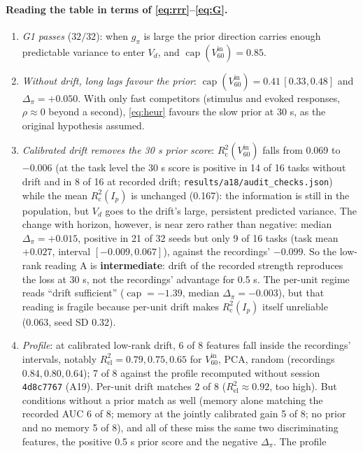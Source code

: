 \documentclass[11pt]{article}
\newcommand{\Rc}{R^2_{\mathrm{c}}}
\begin{document}
\paragraph{Reading the table in terms of \eqref{eq:rrr}--\eqref{eq:G}.}
\begin{enumerate}
\item \emph{G1 passes} ($32/32$): when $g_\pi$ is large the prior direction carries enough predictable variance to
  enter $V_d$, and $\operatorname{cap}(V^{\mathrm{in}}_{60}) = 0.85$.
\item \emph{Without drift, long lags favour the prior}: $\operatorname{cap}(V^{\mathrm{in}}_{60}) = 0.41\,[0.33, 0.48]$ and
  $\Delta_\pi = +0.050$. With only fast competitors (stimulus and evoked responses, $\rho \approx 0$ beyond a second),
  \eqref{eq:heur} favours the slow prior at 30 s, as the original hypothesis assumed.
\item \emph{Calibrated drift removes the 30 s prior score}: $\Rc(V^{\mathrm{in}}_{60})$ falls from 0.069 to $-0.006$
  (at the task level the 30 s score is positive in 14 of 16 tasks without drift and in 8 of 16 at recorded drift;
  \texttt{results/a18/audit\_checks.json}) while the mean $\Rc(I_p)$ is unchanged (0.167): the information is still in the population, but $V_d$
  goes to the drift's large, persistent predicted variance. The change with horizon, however, is near zero rather
  than negative: median $\Delta_\pi = +0.015$, positive in 21 of 32 seeds but only 9 of 16 tasks (task mean $+0.027$,
  interval $[-0.009, 0.067]$), against the recordings' $-0.099$. So the low-rank reading A is \textbf{intermediate}:
  drift of the recorded strength reproduces the loss at 30 s, not the recordings' advantage for 0.5 s. The per-unit
  regime reads ``drift sufficient'' ($\operatorname{cap} = -1.39$, median $\Delta_\pi = -0.003$), but that reading is
  fragile because per-unit drift makes $\Rc(I_p)$ itself unreliable (0.063, seed SD 0.32).
\item \emph{Profile}: at calibrated low-rank drift, 6 of 8 features fall inside the recordings' intervals, notably
  $R^2_{\mathrm{el}} = 0.79, 0.75, 0.65$ for $V^{\mathrm{in}}_{60}$, PCA, random (recordings $0.84, 0.80, 0.64$);
  7 of 8 against the profile recomputed without session \texttt{4d8c7767} (A19). Per-unit drift matches 2 of 8
  ($R^2_{\mathrm{el}} \approx 0.92$, too high). But conditions without a prior match as well (memory alone matching the
  recorded AUC 6 of 8; memory at the jointly calibrated gain 5 of 8; no prior and no memory 5 of 8), and all of these
  miss the same two discriminating features, the positive 0.5 s prior score and the negative $\Delta_\pi$. The profile

\end{enumerate}
\end{document}
